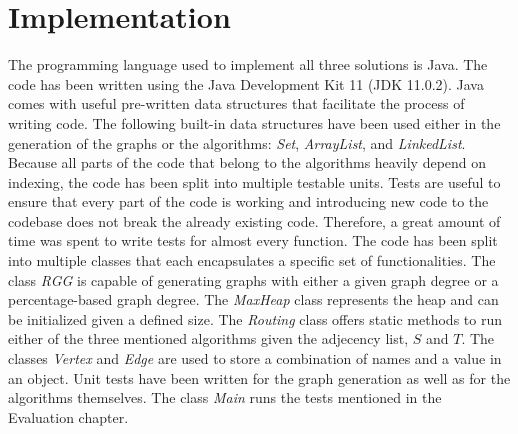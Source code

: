 \documentclass{article}
\begin{document}
\section{Implementation}
The programming language used to implement all three solutions is Java. The code has been written using the Java Development Kit 11 (JDK 11.0.2). Java comes with useful pre-written data structures that facilitate the process of writing code. The following built-in data structures have been used either in the generation of the graphs or the algorithms: \textit{Set}, \textit{ArrayList}, and \textit{LinkedList}. Because all parts of the code that belong to the algorithms heavily depend on indexing, the code has been split into multiple testable units. Tests  are useful to ensure that every part of the code is working and introducing new code to the codebase does not break the already existing code. Therefore, a great amount of time was spent to write tests for almost every function. The code has been split into multiple classes that each encapsulates a specific set of functionalities. The class \textit{RGG} is capable of generating graphs with either a given graph degree or a percentage-based graph degree. The \textit{MaxHeap} class represents the heap and can be initialized given a defined size. The \textit{Routing} class offers static methods to run either of the three mentioned algorithms given the adjecency list, $S$ and $T$. The classes \textit{Vertex} and \textit{Edge} are used to store a combination of names and a value in an object. Unit tests have been written for the graph generation as well as for the algorithms themselves. The class \textit{Main} runs the tests mentioned in the Evaluation chapter.
\end{document}
